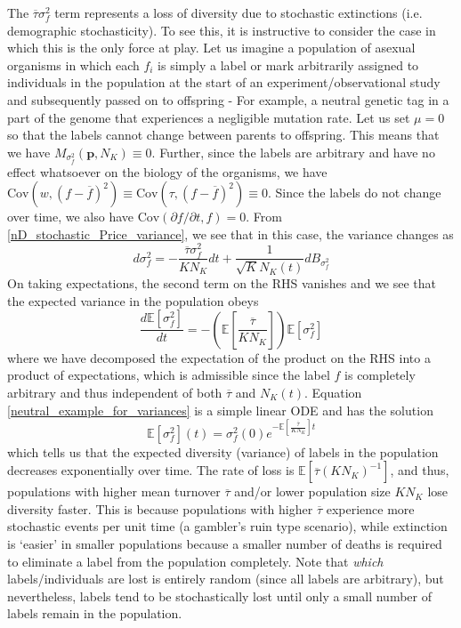 The $\overline{\tau}\sigma^2_{f}$ term represents a loss of diversity due to stochastic extinctions (i.e. demographic stochasticity). To see this, it is instructive to consider the case in which this is the only force at play. Let us imagine a population of asexual organisms in which each $f_i$ is simply a label or mark arbitrarily assigned to individuals in the population at the start of an experiment/observational study and subsequently passed on to offspring - For example, a neutral genetic tag in a part of the genome that experiences a negligible mutation rate. Let us set $\mu = 0$ so that the labels cannot change between parents to offspring. This means that we have $M_{\sigma^2_f}(\mathbf{p},N_K) \equiv 0$. Further, since the labels are arbitrary and have no effect whatsoever on the biology of the organisms, we have $\textrm{Cov}\left(w,(f - \overline{f})^2\right) \equiv \textrm{Cov}\left(\tau,(f - \overline{f})^2\right) \equiv 0$. Since the labels do not change over time, we also have $\textrm{Cov}\left(\partial f/\partial t,f\right) = 0$. From \eqref{nD_stochastic_Price_variance}, we see that in this case, the variance changes as
\begin{equation}
d\sigma^2_f = - \frac{\overline{\tau}\sigma^2_{f}}{KN_K}dt + \frac{1}{\sqrt{K}N_{K}(t)}dB_{\sigma^2_{f}}
\end{equation}
On taking expectations, the second term on the RHS vanishes and we see that the expected variance in the population obeys
\begin{equation}
\label{neutral_example_for_variances}
\frac{d \mathbb{E}[\sigma^2_f]}{dt} = - \left(\mathbb{E}\left[\frac{\overline{\tau}}{KN_K}\right]\right)\mathbb{E}[\sigma^2_{f}]
\end{equation}
where we have decomposed the expectation of the product on the RHS into a product of expectations, which is admissible since the label $f$ is completely arbitrary and thus independent of both $\overline{\tau}$ and $N_K(t)$. Equation \eqref{neutral_example_for_variances} is a simple linear ODE and has the solution
\begin{equation}
\mathbb{E}[\sigma^2_f](t) = \sigma^2_f(0)e^{-\mathbb{E}\left[\frac{\overline{\tau}}{KN_K}\right]t}
\end{equation}
which tells us that the expected diversity (variance) of labels in the population decreases exponentially over time. The rate of loss is $\mathbb{E}\left[\overline{\tau}(KN_K)^{-1}\right]$, and thus, populations with higher mean turnover $\overline{\tau}$  and/or lower population size $KN_K$ lose diversity faster. This is because populations with higher $\overline{\tau}$ experience more stochastic events per unit time (a gambler's ruin type scenario), while extinction is `easier' in smaller populations because a smaller number of deaths is required to eliminate a label from the population completely. Note that \emph{which} labels/individuals are lost is entirely random (since all labels are arbitrary), but nevertheless, labels tend to be stochastically lost until only a small number of labels remain in the population.

